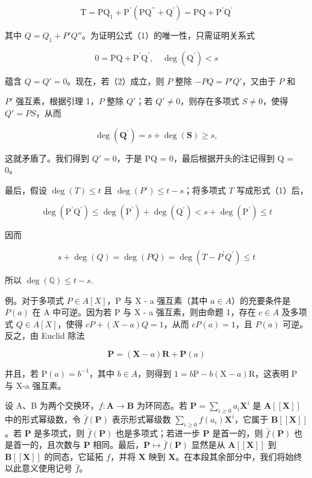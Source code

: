 \[
\mathrm{T} = \mathrm{PQ} _ {1} + \mathrm{P} ^ {\prime} (\mathrm{PQ} ^ {\prime \prime} + \mathrm{Q} ^ {\prime}) = \mathrm{PQ} + \mathrm{P} ^ {\prime} \mathrm{Q} ^ {\prime}
\]

其中 \(Q = Q_{1} + P'Q''\)。为证明公式（1）的唯一性，只需证明关系式

\[
0 = \mathrm{PQ} + \mathrm{P} ^ {\prime} \mathrm{Q} ^ {\prime}, \quad \deg (\mathrm{Q} ^ {\prime}) <   s\tag{2}
\]

蕴含 \(Q = Q' = 0\)。现在，若（2）成立，则 \(P\) 整除 \(-PQ = P'Q'\)，又由于 \(P\) 和

\(P'\) 强互素，根据引理 1，\(P\) 整除 \(Q'\)；若 \(Q' \neq 0\)，则存在多项式 \(S \neq 0\)，使得 \(Q' = PS\)，从而

\[
\deg (\mathbf {Q} ^ {\prime}) = s + \deg (\mathbf {S}) \geqslant s,
\]

这就矛盾了。我们得到 \(Q' = 0\)，于是 PQ = 0，最后根据开头的注记得到 Q = 0。

最后，假设 \(\deg(T) \leqslant t\) 且 \(\deg(P') \leqslant t - s\)；将多项式 \(T\) 写成形式（1）后，

\[
\deg (\mathrm{P} ^ {\prime} \mathrm{Q} ^ {\prime}) \leqslant \deg (\mathrm{P} ^ {\prime}) + \deg (\mathrm{Q} ^ {\prime}) <   s + \deg (\mathrm{P} ^ {\prime}) \leqslant t
\]

因而

\[
s + \deg (Q) = \deg (P Q) = \deg (T - P ^ {\prime} Q ^ {\prime}) \leqslant t
\]

所以 \(\deg (\mathbb{Q})\leqslant t - s.\)

例。对于多项式 \(P \in A[X]\)，P 与 X - a 强互素（其中 \(a \in A\)）的充要条件是 \(P(a)\) 在 A 中可逆。因为若 P 与 X - a 强互素，则由命题 1，存在 \(c \in A\) 及多项式 \(Q \in A[X]\)，使得 \(cP + (X - a)Q = 1\)，从而 \(cP(a) = 1\)，且 \(P(a)\) 可逆。反之，由 Euclid 除法

\[
\mathbf {P} = (\mathbf {X} - a) \mathbf {R} + \mathbf {P} (a)
\]

并且，若 \(\mathrm{P}(a)=b^{-1}\)，其中 \(b\in A\)，则得到 \(1=b\mathrm{P}-b(\mathrm{X}-a)\mathrm{R}\)，这表明 P 与 X-a 强互素。

设 A、B 为两个交换环，\(f\colon\mathbf{A}\to\mathbf{B}\) 为环同态。若 \(\mathbf{P}=\sum_{i\geqslant0}a_{i}\mathbf{X}^{i}\) 是 \(\mathbf{A}[[\mathbf{X}]]\) 中的形式幂级数，令 \(\bar{f}(\mathbf{P})\) 表示形式幂级数 \(\sum_{i\geqslant0}f(a_{i})\mathbf{X}^{i}\)，它属于 \(\mathbf{B}[[\mathbf{X}]]\)。若 \(\mathbf{P}\) 是多项式，则 \(\bar{f}(\mathbf{P})\) 也是多项式；若进一步 \(\mathbf{P}\) 是首一的，则 \(\bar{f}(\mathbf{P})\) 也是首一的，且次数与 \(\mathbf{P}\) 相同。最后，\(\mathbf{P}\mapsto\bar{f}(\mathbf{P})\) 显然是从 \(\mathbf{A}[[\mathbf{X}]]\) 到 \(\mathbf{B}[[\mathbf{X}]]\) 的同态，它延拓 \(f\)，并将 \(\mathbf{X}\) 映到 \(\mathbf{X}\)。在本段其余部分中，我们将始终以此意义使用记号 \(\bar{f}\)。

